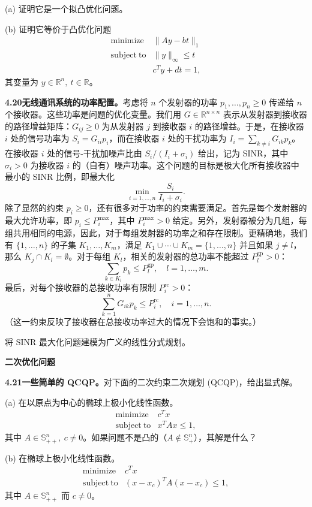 \documentclass[UTF8,12pt,a4paper,fontset=fandol]{ctexart}
\begin{document}
(a) 证明它是一个拟凸优化问题。

(b) 证明它等价于凸优化问题
\[
\begin{array}{ll}
\mathop{\mathrm{minimize}} & \|Ay-bt\|_1\\
\mathrm{subject\ to} & \|y\|_\infty\leq t\\
& c^Ty+dt=1,
\end{array}
\]
其变量为 $y\in\mathbb{R}^n,\ t\in\mathbb{R}$。

\noindent\textbf{4.20\quad 无线通讯系统的功率配置。}\quad 考虑将 $n$ 个发射器的功率 $p_1,\ldots,p_n\geq0$ 传递给 $n$ 个接收器。这些功率是问题的优化变量。我们用 $G\in\mathbb{R}^{n\times n}$ 表示从发射器到接收器的路径增益矩阵：$G_{ij}\geq0$ 为从发射器 $j$ 到接收器 $i$ 的路径增益。于是，在接收器 $i$ 处的信号功率为 $S_i=G_{ii}p_i$，而在接收器 $i$ 处的干扰功率为 $I_i=\sum_{k\neq i}G_{ik}p_k$。在接收器 $i$ 处的信号-干扰加噪声比由 $S_i/(I_i+\sigma_i)$ 给出，记为 SINR，其中 $\sigma_i>0$ 为接收器 $i$ 的（自有）噪声功率。这个问题的目标是极大化所有接收器中最小的 SINR 比例，即最大化
\[
\min_{i=1,\ldots,n}\frac{S_i}{I_i+\sigma_i}.
\]
除了显然的约束 $p_i\geq0$，还有很多对于功率的约束需要满足。首先是每个发射器的最大允许功率，即 $p_i\leq P_i^{\max}$，其中 $P_i^{\max}>0$ 给定。另外，发射器被分为几组，每组共用相同的电源，因此，对于每组发射器的功率之和存在限制。更精确地，我们有 $\{1,\ldots,n\}$ 的子集 $K_1,\ldots,K_m$，满足 $K_1\cup\cdots\cup K_m=\{1,\ldots,n\}$ 并且如果 $j\neq l$，那么 $K_j\cap K_l=\emptyset$。对于每组 $K_l$，相关的发射器的总功率不能超过 $P_l^{\mathrm{gp}}>0$：
\[
\sum_{k\in K_l}p_k\leq P_l^{\mathrm{gp}},\quad l=1,\ldots,m.
\]
最后，对每个接收器的总接收功率有限制 $P_i^{\mathrm{rc}}>0$：
\[
\sum_{k=1}^n G_{ik}p_k\leq P_i^{\mathrm{rc}},\quad i=1,\ldots,n.
\]
（这一约束反映了接收器在总接收功率过大的情况下会饱和的事实。）

将 SINR 最大化问题建模为广义的线性分式规划。

\noindent\textbf{二次优化问题}

\noindent\textbf{4.21\quad 一些简单的 QCQP。}\quad 对下面的二次约束二次规划 (QCQP)，给出显式解。

(a) 在以原点为中心的椭球上极小化线性函数。
\[
\begin{array}{ll}
\mathop{\mathrm{minimize}} & c^Tx\\
\mathrm{subject\ to} & x^TAx\leq1,
\end{array}
\]
其中 $A\in\mathbb{S}_{++}^n,\ c\neq0$。如果问题不是凸的（$A\notin\mathbb{S}_+^n$），其解是什么？

(b) 在椭球上极小化线性函数。
\[
\begin{array}{ll}
\mathop{\mathrm{minimize}} & c^Tx\\
\mathrm{subject\ to} & (x-x_c)^TA(x-x_c)\leq1,
\end{array}
\]
其中 $A\in\mathbb{S}_{++}^n$ 而 $c\neq0$。
\end{document}
